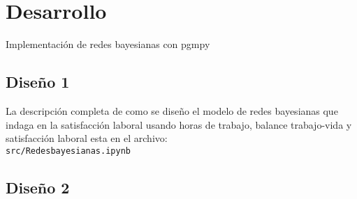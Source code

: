\section{Desarrollo}
\begin{center}
    Implementación de redes bayesianas con pgmpy
\end{center}

\subsection{Diseño 1}   

La descripción completa de como se diseño el modelo de redes bayesianas que indaga en la 
satisfacción laboral usando horas de trabajo, balance trabajo-vida y satisfacción laboral 
esta en el archivo:\\ 
\texttt{src/Redesbayesianas.ipynb}


\subsection{Diseño 2}

